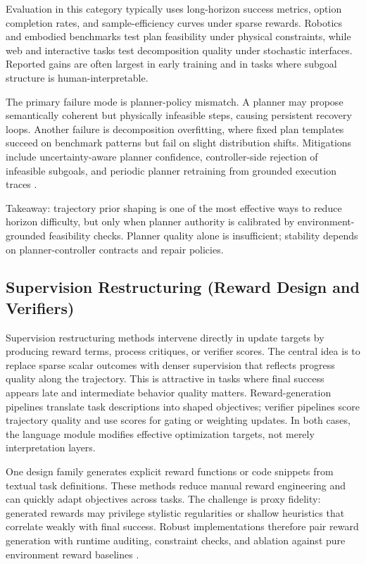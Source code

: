 \documentclass[pdflatex,sn-mathphys-num]{sn-jnl}
\begin{document}
Evaluation in this category typically uses long-horizon success metrics, option completion rates, and sample-efficiency curves under sparse rewards. Robotics and embodied benchmarks test plan feasibility under physical constraints, while web and interactive tasks test decomposition quality under stochastic interfaces. Reported gains are often largest in early training and in tasks where subgoal structure is human-interpretable.

The primary failure mode is planner-policy mismatch. A planner may propose semantically coherent but physically infeasible steps, causing persistent recovery loops. Another failure is decomposition overfitting, where fixed plan templates succeed on benchmark patterns but fail on slight distribution shifts. Mitigations include uncertainty-aware planner confidence, controller-side rejection of infeasible subgoals, and periodic planner retraining from grounded execution traces \cite{arxiv_p_2602_16165,arxiv_p_2512_20275,arxiv_p_2512_12716}.

Takeaway: trajectory prior shaping is one of the most effective ways to reduce horizon difficulty, but only when planner authority is calibrated by environment-grounded feasibility checks. Planner quality alone is insufficient; stability depends on planner-controller contracts and repair policies.

\subsection{Supervision Restructuring (Reward Design and Verifiers)}
Supervision restructuring methods intervene directly in update targets by producing reward terms, process critiques, or verifier scores. The central idea is to replace sparse scalar outcomes with denser supervision that reflects progress quality along the trajectory. This is attractive in tasks where final success appears late and intermediate behavior quality matters. Reward-generation pipelines translate task descriptions into shaped objectives; verifier pipelines score trajectory quality and use scores for gating or weighting updates. In both cases, the language module modifies effective optimization targets, not merely interpretation layers.

One design family generates explicit reward functions or code snippets from textual task definitions. These methods reduce manual reward engineering and can quickly adapt objectives across tasks. The challenge is proxy fidelity: generated rewards may privilege stylistic regularities or shallow heuristics that correlate weakly with final success. Robust implementations therefore pair reward generation with runtime auditing, constraint checks, and ablation against pure environment reward baselines \cite{arxiv_p_2310_12931,arxiv_p_2309_11489,arxiv_p_2309_06687,doi_p_10_3390_app14198868}.
\end{document}

